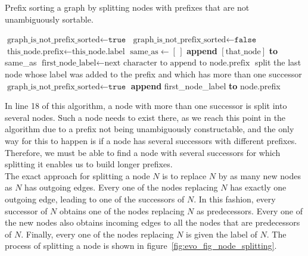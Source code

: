 \documentclass[a4paper,12pt,twoside,BCOR=10mm]{scrbook}
\begin{document}
\begin{algorithm}
\caption[Prefix sort a graph]{Prefix sorting a graph by splitting nodes with prefixes that are not unambiguously sortable.}
\label{alg:workOnAutomatonPrefixes}
\begin{algorithmic}[1]
\State $ \textrm{graph\_is\_not\_prefix\_sorted} \gets \texttt{true} $
	\State $ \textrm{graph\_is\_not\_prefix\_sorted} \gets \texttt{false} $
		\State $ \textrm{this\_node.prefix} \gets \textrm{this\_node.label} $
	\EndFor
		\State $ \textrm{same\_as} \gets [ \, ] $
				\State \textbf{append} $ [\textrm{that\_node}] $ \textbf{to} same\_as
			\EndIf
		\EndFor
				\State $ \textrm{first\_node\_label} \gets \textrm{next character to append to node.prefix} $
					\State split the last node whose label was added to the prefix and which
						\State \phantom{first} has more than one successor
					\State $ \textrm{graph\_is\_not\_prefix\_sorted} \gets \texttt{true} $
				\Else
					\State \textbf{append} first\_node\_label \textbf{to} node.prefix
				\EndIf
			\EndFor
		\EndIf
	\EndFor
\EndWhile
\end{algorithmic}
\end{algorithm}
In line 18 of this algorithm, a node with more than one successor is split into several nodes. 
Such a node needs to exist there, as we reach this point in the algorithm due to a prefix 
not being unambiguously constructable, and the only way for this to happen is if a node has 
several successors with different prefixes. Therefore, we must be able to find a node with 
several successors for which splitting it enables us to build longer prefixes. \\
The exact approach for splitting a node $ N $ is to replace $ N $ by as many new nodes as $ N $ has 
outgoing edges. 
Every one of the nodes replacing $ N $ has exactly one outgoing edge, leading to 
one of the successors of $ N $. 
In this fashion, every successor of $ N $ obtains one of the nodes replacing $ N $ as predecessors. 
Every one of the new nodes also obtains incoming edges to all the nodes that are predecessors of $ N $. 
Finally, every one of the nodes replacing $ N $ is given the label of $ N $. 
The process of splitting a node is shown in figure~\ref{fig:evo_fig_node_splitting}.
\end{document}
